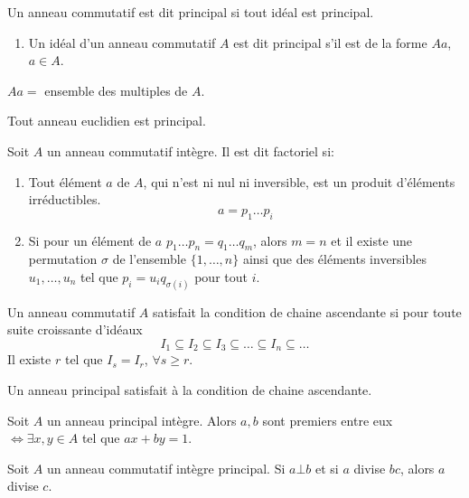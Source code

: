 \documentclass[12pt,a4paper]{article}
\begin{document}
\begin{flushleft}
\begin{mydef}
Un anneau commutatif est dit principal si tout idéal est principal.
\begin{enumerate}
\item Un idéal d'un anneau commutatif $A$ est dit principal s'il est de la forme $Aa$, $a \in A$.
\end{enumerate}
\end{mydef}

\begin{rem}
$Aa = $ ensemble des multiples de $A$.
\end{rem}

\begin{thm}
Tout anneau euclidien est principal.
\end{thm}

\begin{mydef}
Soit $A$ un anneau commutatif intègre. Il est dit factoriel si: 
\begin{enumerate}
\item Tout élément $a$ de $A$, qui n'est ni nul ni inversible, est un produit d'éléments irréductibles.
$$ a = p_1 \ldots p_i$$
\item Si pour un élément de $a$ $p_1 \ldots p_n = q_1 \ldots q_m$, alors $m = n$ et il existe une 	permutation $\sigma$ de l'ensemble $\{ 1, \ldots , n \}$ ainsi que des éléments inversibles $u_1 , \ldots , u_n$ tel que $p_i = u_i q_{\sigma (i)}$ pour tout $i$.
\end{enumerate}
\end{mydef}

\begin{mydef}
Un anneau commutatif $A$ satisfait la condition de chaine ascendante si pour toute suite croissante d'idéaux
$$I_1 \subseteq I_2 \subseteq I_3 \subseteq \ldots \subseteq I_n \subseteq \ldots$$
Il existe $r$ tel que $I_s = I_r$, $\forall s \geq r$.
\end{mydef}

\begin{lem}
Un anneau principal satisfait à la condition de chaine ascendante.
\end{lem}

\begin{lem}
Soit $A$ un anneau principal intègre. Alors $a, b$ sont premiers entre eux $\Leftrightarrow \exists x, y \in A$ tel que $ax + by = 1$.
\end{lem}

\begin{lem}
Soit $A$ un anneau commutatif intègre principal. Si $a \bot b$ et si $a$ divise $bc$, alors $a$ divise $c$.
\end{lem}


\end{flushleft}
\end{document}
